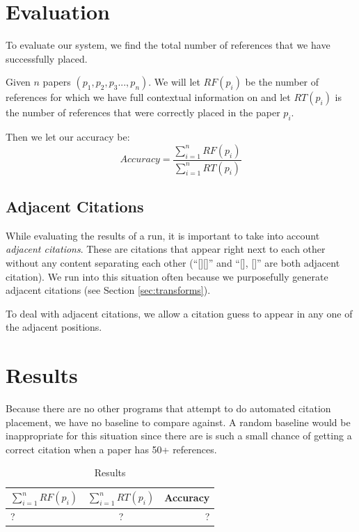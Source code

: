 \documentclass[10pt, conference, compsocconf]{IEEEtran}
\begin{document}
\section{Evaluation}
To evaluate our system, we find the total number of references that we have successfully placed.

Given $n$ papers $(p_{1}, p_{2}, p_{3} ..., p_{n})$. We will let $RF(p_{i})$ be the number of references
for which we have full contextual information on and let $RT(p_{i})$ is the number of references
that were correctly placed in the paper $p_{i}$.

Then we let our accuracy be:
$$Accuracy = \frac{\sum_{i = 1}^{n} RF(p_{i})}{\sum_{i = 1}^{n} RT(p_{i})}$$

\subsection{Adjacent Citations}
While evaluating the results of a run, it is important to take into account \textit{adjacent citations}.
These are citations that appear right next to each other without any content separating each other (``[][]'' and ``[], []''
are both adjacent citation). We run into this situation often because we purposefully generate adjacent citations (see
Section \ref{sec:transforms}).

To deal with adjacent citations, we allow a citation guess to appear in any one of the adjacent positions.

\section{Results}\label{sec:results}
Because there are no other programs that attempt to do automated citation placement, we have no baseline to compare against.
A random baseline would be inappropriate for this situation since there are is such a small chance of getting a correct
citation when a paper has 50+ references.

\begin{table}[H]
\centering
\begin{tabular} { l | c | r }
\hline\hline
        {\bf $\sum_{i = 1}^{n} RF(p_{i})$} & {\bf $\sum_{i = 1}^{n} RT(p_{i})$} & {\bf Accuracy} \\[0.5ex]
\hline
        ? & ? & ? \\[0.5ex]
\end{tabular}
\caption{Results}
\label{tab:results}
\end{table}
\end{document}
